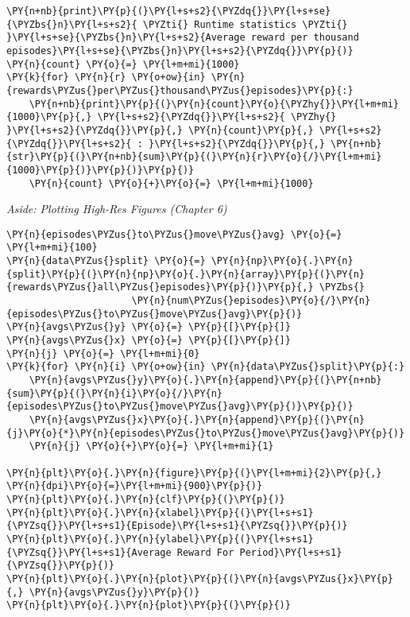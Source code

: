 \begin{tcolorbox}[breakable, size=fbox, boxrule=1pt, pad at break*=1mm,colback=cellbackground, colframe=cellborder]
\begin{Verbatim}[commandchars=\\\{\}]
\PY{n+nb}{print}\PY{p}{(}\PY{l+s+s2}{\PYZdq{}}\PY{l+s+se}{\PYZbs{}n}\PY{l+s+s2}{ \PYZti{} Runtime statistics \PYZti{} }\PY{l+s+se}{\PYZbs{}n}\PY{l+s+s2}{Average reward per thousand episodes}\PY{l+s+se}{\PYZbs{}n}\PY{l+s+s2}{\PYZdq{}}\PY{p}{)}
\PY{n}{count} \PY{o}{=} \PY{l+m+mi}{1000}
\PY{k}{for} \PY{n}{r} \PY{o+ow}{in} \PY{n}{rewards\PYZus{}per\PYZus{}thousand\PYZus{}episodes}\PY{p}{:}
    \PY{n+nb}{print}\PY{p}{(}\PY{n}{count}\PY{o}{\PYZhy{}}\PY{l+m+mi}{1000}\PY{p}{,} \PY{l+s+s2}{\PYZdq{}}\PY{l+s+s2}{ \PYZhy{} }\PY{l+s+s2}{\PYZdq{}}\PY{p}{,} \PY{n}{count}\PY{p}{,} \PY{l+s+s2}{\PYZdq{}}\PY{l+s+s2}{ : }\PY{l+s+s2}{\PYZdq{}}\PY{p}{,} \PY{n+nb}{str}\PY{p}{(}\PY{n+nb}{sum}\PY{p}{(}\PY{n}{r}\PY{o}{/}\PY{l+m+mi}{1000}\PY{p}{)}\PY{p}{)}\PY{p}{)}
    \PY{n}{count} \PY{o}{+}\PY{o}{=} \PY{l+m+mi}{1000}
\end{Verbatim}
\end{tcolorbox}

    \emph{Aside: Plotting High-Res Figures (Chapter 6)}

    \begin{tcolorbox}[breakable, size=fbox, boxrule=1pt, pad at break*=1mm,colback=cellbackground, colframe=cellborder]
\begin{Verbatim}[commandchars=\\\{\}]
\PY{n}{episodes\PYZus{}to\PYZus{}move\PYZus{}avg} \PY{o}{=} \PY{l+m+mi}{100}
\PY{n}{data\PYZus{}split} \PY{o}{=} \PY{n}{np}\PY{o}{.}\PY{n}{split}\PY{p}{(}\PY{n}{np}\PY{o}{.}\PY{n}{array}\PY{p}{(}\PY{n}{rewards\PYZus{}all\PYZus{}episodes}\PY{p}{)}\PY{p}{,} \PYZbs{}
                      \PY{n}{num\PYZus{}episodes}\PY{o}{/}\PY{n}{episodes\PYZus{}to\PYZus{}move\PYZus{}avg}\PY{p}{)}
\PY{n}{avgs\PYZus{}y} \PY{o}{=} \PY{p}{[}\PY{p}{]}
\PY{n}{avgs\PYZus{}x} \PY{o}{=} \PY{p}{[}\PY{p}{]}
\PY{n}{j} \PY{o}{=} \PY{l+m+mi}{0}
\PY{k}{for} \PY{n}{i} \PY{o+ow}{in} \PY{n}{data\PYZus{}split}\PY{p}{:}
    \PY{n}{avgs\PYZus{}y}\PY{o}{.}\PY{n}{append}\PY{p}{(}\PY{n+nb}{sum}\PY{p}{(}\PY{n}{i}\PY{o}{/}\PY{n}{episodes\PYZus{}to\PYZus{}move\PYZus{}avg}\PY{p}{)}\PY{p}{)}
    \PY{n}{avgs\PYZus{}x}\PY{o}{.}\PY{n}{append}\PY{p}{(}\PY{n}{j}\PY{o}{*}\PY{n}{episodes\PYZus{}to\PYZus{}move\PYZus{}avg}\PY{p}{)}
    \PY{n}{j} \PY{o}{+}\PY{o}{=} \PY{l+m+mi}{1}

\PY{n}{plt}\PY{o}{.}\PY{n}{figure}\PY{p}{(}\PY{l+m+mi}{2}\PY{p}{,} \PY{n}{dpi}\PY{o}{=}\PY{l+m+mi}{900}\PY{p}{)}
\PY{n}{plt}\PY{o}{.}\PY{n}{clf}\PY{p}{(}\PY{p}{)}        
\PY{n}{plt}\PY{o}{.}\PY{n}{xlabel}\PY{p}{(}\PY{l+s+s1}{\PYZsq{}}\PY{l+s+s1}{Episode}\PY{l+s+s1}{\PYZsq{}}\PY{p}{)}
\PY{n}{plt}\PY{o}{.}\PY{n}{ylabel}\PY{p}{(}\PY{l+s+s1}{\PYZsq{}}\PY{l+s+s1}{Average Reward For Period}\PY{l+s+s1}{\PYZsq{}}\PY{p}{)}
\PY{n}{plt}\PY{o}{.}\PY{n}{plot}\PY{p}{(}\PY{n}{avgs\PYZus{}x}\PY{p}{,} \PY{n}{avgs\PYZus{}y}\PY{p}{)}
\PY{n}{plt}\PY{o}{.}\PY{n}{plot}\PY{p}{(}\PY{p}{)}
\end{Verbatim}
\end{tcolorbox}

